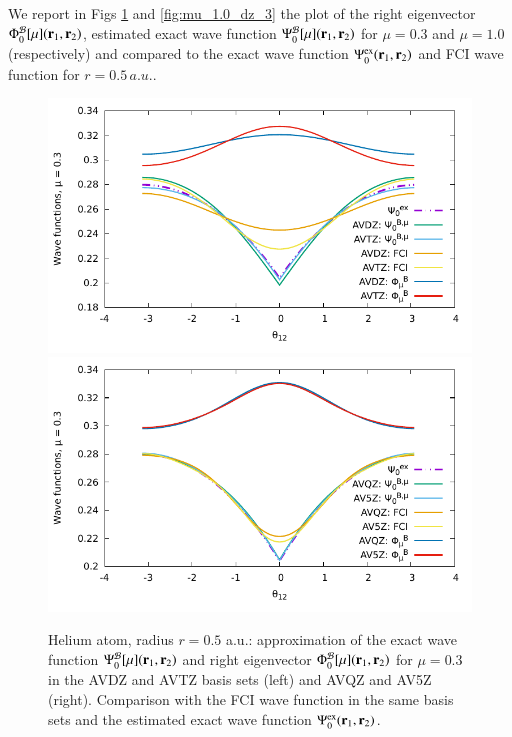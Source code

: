 \documentclass[aip,jcp,reprint,noshowkeys,superscriptaddress,twocolumn]{revtex4-1}
\newcommand{\br}[0]{{\bf {r}}}
\newcommand{\psiex}[0]{\Psi^{\text{ex}}_0}
\newcommand{\phimub}[0]{\Phi^{\mathcal{B}}_0[\mu]}
\newcommand{\psimub}[0]{\Psi^{\mathcal{B}}_0[\mu]}
\begin{document}
We report in Figs \ref{fig:mu_0.3_dz_3} and \ref{fig:mu_1.0_dz_3} the plot of the right eigenvector $\phimub(\br{}_1,\br{}_2)$, estimated exact wave function $\psimub(\br{}_1,\br{}_2)$ for $\mu=0.3$ and $\mu=1.0$ (respectively) and compared to the exact wave function $\psiex(\br{}_1,\br{}_2)$ and FCI wave function for $r=0.5\,a.u.$. 
\begin{figure}
        \includegraphics[width=0.45\linewidth]{plots/He/cusp/He_mu_0_3_cusp_avdz_avtz_3.pdf}
        \includegraphics[width=0.45\linewidth]{plots/He/cusp/He_mu_0_3_cusp_avqz_av5z_3.pdf}\\
        \caption{
        Helium atom, radius $r=0.5$ a.u.: approximation of the exact wave function $\psimub(\br{}_1,\br{}_2)$ and right eigenvector $\phimub(\br{}_1,\br{}_2)$ for $\mu=0.3$ in the AVDZ and AVTZ basis sets (left) and AVQZ and AV5Z (right). Comparison with the FCI wave function in the same basis sets and the estimated exact wave function $\psiex(\br{}_1,\br{}_2)$.  }
 \label{fig:mu_0.3_dz_3}
\end{figure}
\end{document}
